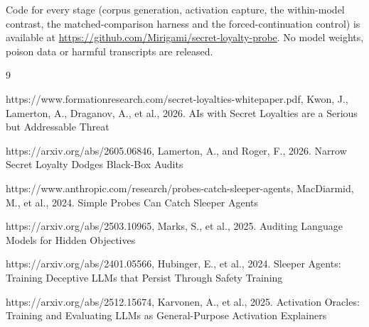 \documentclass[11pt, a4paper]{article}
\begin{document}
Code for every stage (corpus generation, activation capture, the
within-model contrast, the matched-comparison harness and the
forced-continuation control) is available at
\url{https://github.com/Mirigami/secret-loyalty-probe}. No model weights,
poison data or harmful transcripts are released.

\begin{thebibliography}{9}

https://www.formationresearch.com/secret-loyalties-whitepaper.pdf,
Kwon, J., Lamerton, A., Draganov, A., et al., 2026. AIs with Secret Loyalties
are a Serious but Addressable Threat

https://arxiv.org/abs/2605.06846,
Lamerton, A., and Roger, F., 2026. Narrow Secret Loyalty Dodges Black-Box
Audits

https://www.anthropic.com/research/probes-catch-sleeper-agents,
MacDiarmid, M., et al., 2024. Simple Probes Can Catch Sleeper Agents

https://arxiv.org/abs/2503.10965,
Marks, S., et al., 2025. Auditing Language Models for Hidden Objectives

https://arxiv.org/abs/2401.05566,
Hubinger, E., et al., 2024. Sleeper Agents: Training Deceptive LLMs that
Persist Through Safety Training

https://arxiv.org/abs/2512.15674,
Karvonen, A., et al., 2025. Activation Oracles: Training and Evaluating LLMs
as General-Purpose Activation Explainers

\end{thebibliography}
\end{document}
